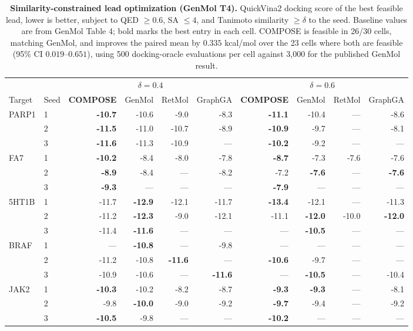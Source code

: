 \begin{table}[!ht]
\centering\footnotesize\setlength{\tabcolsep}{4pt}
\begin{tabular}{ll rrrr rrrr}
\toprule
& & \multicolumn{4}{c}{$\delta=0.4$} & \multicolumn{4}{c}{$\delta=0.6$} \\
\cmidrule(lr){3-6}\cmidrule(lr){7-10}
Target & Seed & \textbf{COMPOSE} & GenMol & RetMol & GraphGA & \textbf{COMPOSE} & GenMol & RetMol & GraphGA \\
\midrule
PARP1 & 1 & \textbf{-10.7} & -10.6 & -9.0 & -8.3 & \textbf{-11.1} & -10.4 & --- & -8.6 \\
 & 2 & \textbf{-11.5} & -11.0 & -10.7 & -8.9 & \textbf{-10.9} & -9.7 & --- & -8.1 \\
 & 3 & \textbf{-11.6} & -11.3 & -10.9 & --- & \textbf{-10.2} & -9.2 & --- & --- \\
\addlinespace
FA7 & 1 & \textbf{-10.2} & -8.4 & -8.0 & -7.8 & \textbf{-8.7} & -7.3 & -7.6 & -7.6 \\
 & 2 & \textbf{-8.9} & -8.4 & --- & -8.2 & -7.2 & \textbf{-7.6} & --- & \textbf{-7.6} \\
 & 3 & \textbf{-9.3} & --- & --- & --- & \textbf{-7.9} & --- & --- & --- \\
\addlinespace
5HT1B & 1 & -11.7 & \textbf{-12.9} & -12.1 & -11.7 & \textbf{-13.4} & -12.1 & --- & -11.3 \\
 & 2 & -11.2 & \textbf{-12.3} & -9.0 & -12.1 & -11.1 & \textbf{-12.0} & -10.0 & \textbf{-12.0} \\
 & 3 & -11.4 & \textbf{-11.6} & --- & --- & --- & \textbf{-10.5} & --- & --- \\
\addlinespace
BRAF & 1 & --- & \textbf{-10.8} & --- & -9.8 & --- & --- & --- & --- \\
 & 2 & -11.2 & -10.8 & \textbf{-11.6} & --- & \textbf{-10.6} & -9.7 & --- & --- \\
 & 3 & -10.9 & -10.6 & --- & \textbf{-11.6} & --- & \textbf{-10.5} & --- & -10.4 \\
\addlinespace
JAK2 & 1 & \textbf{-10.3} & -10.2 & -8.2 & -8.7 & \textbf{-9.3} & \textbf{-9.3} & --- & -8.1 \\
 & 2 & -9.8 & \textbf{-10.0} & -9.0 & -9.2 & \textbf{-9.7} & -9.4 & --- & -9.2 \\
 & 3 & \textbf{-10.5} & -9.8 & --- & --- & \textbf{-10.2} & --- & --- & --- \\
\bottomrule
\end{tabular}
\caption{\small\textbf{Similarity-constrained lead optimization (GenMol T4).} QuickVina2 docking score of the best feasible lead, lower is better, subject to QED $\geq0.6$, SA $\leq4$, and Tanimoto similarity $\geq\delta$ to the seed. Baseline values are from GenMol Table 4; bold marks the best entry in each cell. COMPOSE is feasible in 26/30 cells, matching GenMol, and improves the paired mean by $0.335$ kcal/mol over the 23 cells where both are feasible (95\% CI $0.019$--$0.651$), using 500 docking-oracle evaluations per cell against 3{,}000 for the published GenMol result.}
\label{tab:t4}
\end{table}
